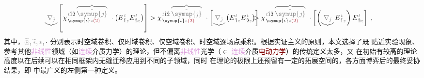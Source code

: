 \begin{subequations}
\begin{align}
	\mathcolor{gray}{\underbrace{\nabla_{\check{\jmath}}}} \left[ \chi^{\;\! \mathcolor{gray}{t} \hat{1} \hat{2} \;\! \mathcolor{gray}{\overbrace{\check{\symup{\jmath}}}}}_{\;\! \symup{\iota} \mathcolor{gray}{z} \textcolor{Maroon}{(2)}} ~\cdot \left( E^{\;\!\mathcolor{gray}{t}}_{\;\! \hat{1} \mathcolor{gray}{z}} E^{\;\!\mathcolor{gray}{t}}_{\;\! \hat{2} \mathcolor{gray}{z}} \right) \right] &> \chi^{\;\! \mathcolor{gray}{t} \hat{1} \hat{2} \;\! \mathcolor{gray}{\overbrace{\check{\symup{\jmath}}}}}_{\;\! \symup{\iota} \mathcolor{gray}{z} \textcolor{Maroon}{(2)}} ~\cdot \left[ \mathcolor{gray}{\underbrace{\nabla_{\check{\jmath}}}} \left( E^{\;\!\mathcolor{gray}{t}}_{\;\! \hat{1} \mathcolor{gray}{z}} E^{\;\!\mathcolor{gray}{t}}_{\;\! \hat{2} \mathcolor{gray}{z}} \right) \right] \hspace{-2em}&&> \chi^{\;\! \mathcolor{gray}{t} \hat{1} \hat{2} \;\! \mathcolor{gray}{\overbrace{\check{\symup{\jmath}}}}}_{\;\! \symup{\iota} \mathcolor{gray}{z} \textcolor{Maroon}{(2)}} ~\cdot \left[ \left( \mathcolor{gray}{\underbrace{\nabla_{\check{\jmath}}}} E^{\;\!\mathcolor{gray}{t}}_{\;\! \hat{1} \mathcolor{gray}{z}} \right) E^{\;\!\mathcolor{gray}{t}}_{\;\! \hat{2} \mathcolor{gray}{z}} \right]~, \label{eq:Volterra-space+time}
\end{align}
\end{subequations}
其中，$\mathcolor{gray}{\widetilde \circledast}, \mathcolor{gray}{\widetilde *}, \mathcolor{gray}{*}, \cdot$ 分别表示时空域卷积、仅时域卷积、仅空域卷积、时空域逐场点乘积。根据实证主义的原则，本文选择了既 {\one} 贴近实验现象、参考其他\textcolor{Plum}{非线性}领域（如\textcolor{Plum}{连续}介质力学）的理论，但不偏离\textcolor{Plum}{非线性}光学（$\in$ \textcolor{Plum}{连续}介质\textcolor{Maroon}{电动力学}）的传统定义太多，又 {\two} 在初始有较高的理论高度以在后续可以在相同框架内无缝迁移应用到不同的子领域，同时 {\three} 在理论的极限上还预留有一定的拓展空间的，各方面博弈后的最终妥协结果，即  中最广义的左侧第一种定义。

